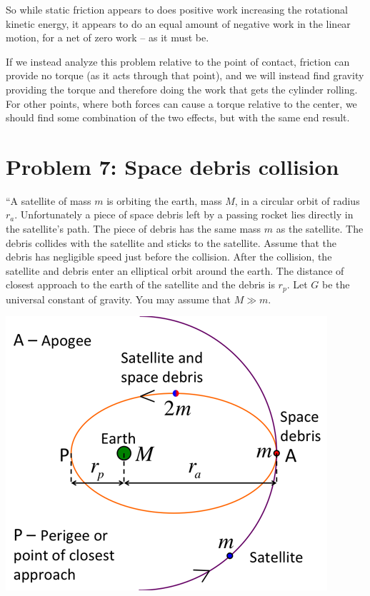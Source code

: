 \documentclass[8.01x]{subfiles}
\begin{document}
So while static friction appears to does positive work increasing the rotational kinetic energy, it appears to do an equal amount of negative work in the linear motion, for a net of zero work -- as it must be.

If we instead analyze this problem relative to the point of contact, friction can provide no torque (as it acts through that point), and we will instead find gravity providing the torque and therefore doing the work that gets the cylinder rolling. For other points, where both forces can cause a torque relative to the center, we should find some combination of the two effects, but with the same end result.

\section{Problem 7: Space debris collision}

``A satellite of mass $m$ is orbiting the earth, mass $M$, in a circular orbit of radius $r_a$. Unfortunately a piece of space debris left by a passing rocket lies directly in the satellite's path. The piece of debris has the same mass $m$ as the satellite. The debris collides with the satellite and sticks to the satellite. Assume that the debris has negligible speed just before the collision. After the collision, the satellite and debris enter an elliptical orbit around the earth. The distance of closest approach to the earth of the satellite and the debris is $r_p$. Let $G$ be the universal constant of gravity. You may assume that $M \gg m$.

\begin{center}
\includegraphics[scale=0.65]{Graphics/h8p7}
\end{center}
\end{document}
